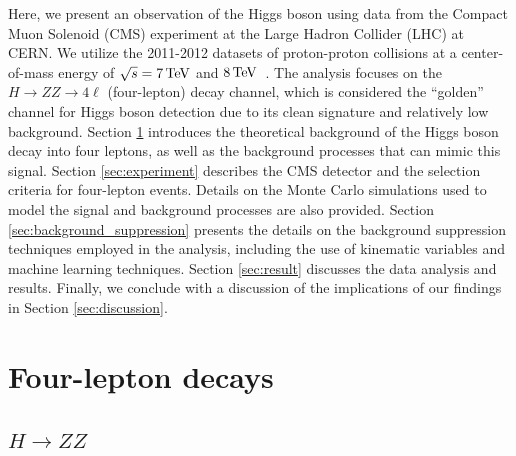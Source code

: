 \documentclass[aps,twocolumn,secnumarabic,balancelastpage,amsmath,amssymb,nofootinbib,floatfix]{revtex4-1}
\newcommand{\TeV}{\,{\rm TeV}}
\begin{document}
Here, we present an observation of the Higgs boson using data from the Compact Muon Solenoid (CMS) experiment at the Large Hadron Collider (LHC) at CERN. We utilize the 2011-2012 datasets of proton-proton collisions at a center-of-mass energy of $\sqrt{s} = 7\TeV$ and $8\TeV$~\citep{Jomhari2017}. The analysis focuses on the $H \to ZZ \to 4\ell$ (four-lepton) decay channel, which is considered the ``golden'' channel for Higgs boson detection due to its clean signature and relatively low background. Section \ref{sec:theory} introduces the theoretical background of the Higgs boson decay into four leptons, as well as the background processes that can mimic this signal. Section \ref{sec:experiment} describes the CMS detector and the selection criteria for four-lepton events. Details on the Monte Carlo simulations used to model the signal and background processes are also provided. Section \ref{sec:background_suppression} presents the details on the background suppression techniques employed in the analysis, including the use of kinematic variables and machine learning techniques. Section \ref{sec:result} discusses the data analysis and results. Finally, we conclude with a discussion of the implications of our findings in Section \ref{sec:discussion}.


\section{Four-lepton decays}
\label{sec:theory}

\subsection{$H \to ZZ$}
\label{ssec:signal_theory}
\end{document}
